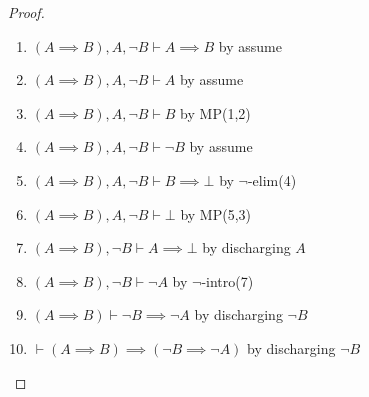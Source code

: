 \begin{proof}
\begin{enumerate}
\item $(A\implies B),A,\neg B\vdash A\implies B$ by assume
\item $(A\implies B),A,\neg B\vdash A$ by assume
\item $(A\implies B),A,\neg B\vdash B$ by MP(1,2)
\item $(A\implies B),A,\neg B\vdash \neg B$ by assume
\item $(A\implies B),A,\neg B\vdash B\implies\bot$ by $\neg$-elim(4)
\item $(A\implies B),A,\neg B\vdash \bot$ by MP(5,3)
\item $(A\implies B),\neg B\vdash A\implies\bot$ by discharging $A$
\item $(A\implies B),\neg B\vdash \neg A$ by $\neg$-intro(7)
\item $(A\implies B)\vdash\neg B\implies \neg A$ by discharging $\neg B$
\item $\vdash(A\implies B)\implies(\neg B\implies \neg A)$ by discharging $\neg B$\qedhere
\end{enumerate}
\end{proof}


